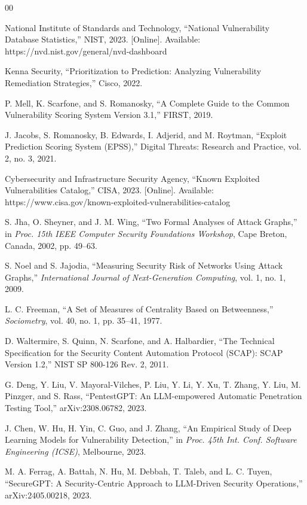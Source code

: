 \documentclass[conference]{IEEEtran}
\begin{document}
\begin{thebibliography}{00}

National Institute of Standards and Technology, ``National Vulnerability Database Statistics,'' NIST, 2023. [Online]. Available: https://nvd.nist.gov/general/nvd-dashboard

Kenna Security, ``Prioritization to Prediction: Analyzing Vulnerability Remediation Strategies,'' Cisco, 2022.

P. Mell, K. Scarfone, and S. Romanosky, ``A Complete Guide to the Common Vulnerability Scoring System Version 3.1,'' FIRST, 2019.

J. Jacobs, S. Romanosky, B. Edwards, I. Adjerid, and M. Roytman, ``Exploit Prediction Scoring System (EPSS),'' Digital Threats: Research and Practice, vol. 2, no. 3, 2021.

Cybersecurity and Infrastructure Security Agency, ``Known Exploited Vulnerabilities Catalog,'' CISA, 2023. [Online]. Available: https://www.cisa.gov/known-exploited-vulnerabilities-catalog

S. Jha, O. Sheyner, and J. M. Wing, ``Two Formal Analyses of Attack Graphs,'' in \textit{Proc. 15th IEEE Computer Security Foundations Workshop}, Cape Breton, Canada, 2002, pp. 49--63.

S. Noel and S. Jajodia, ``Measuring Security Risk of Networks Using Attack Graphs,'' \textit{International Journal of Next-Generation Computing}, vol. 1, no. 1, 2009.

L. C. Freeman, ``A Set of Measures of Centrality Based on Betweenness,'' \textit{Sociometry}, vol. 40, no. 1, pp. 35--41, 1977.

D. Waltermire, S. Quinn, N. Scarfone, and A. Halbardier, ``The Technical Specification for the Security Content Automation Protocol (SCAP): SCAP Version 1.2,'' NIST SP 800-126 Rev. 2, 2011.

G. Deng, Y. Liu, V. Mayoral-Vilches, P. Liu, Y. Li, Y. Xu, T. Zhang, Y. Liu, M. Pinzger, and S. Rass, ``PentestGPT: An LLM-empowered Automatic Penetration Testing Tool,'' arXiv:2308.06782, 2023.

J. Chen, W. Hu, H. Yin, C. Guo, and J. Zhang, ``An Empirical Study of Deep Learning Models for Vulnerability Detection,'' in \textit{Proc. 45th Int. Conf. Software Engineering (ICSE)}, Melbourne, 2023.

M. A. Ferrag, A. Battah, N. Hu, M. Debbah, T. Taleb, and L. C. Tuyen, ``SecureGPT: A Security-Centric Approach to LLM-Driven Security Operations,'' arXiv:2405.00218, 2023.

\end{thebibliography}
\end{document}

